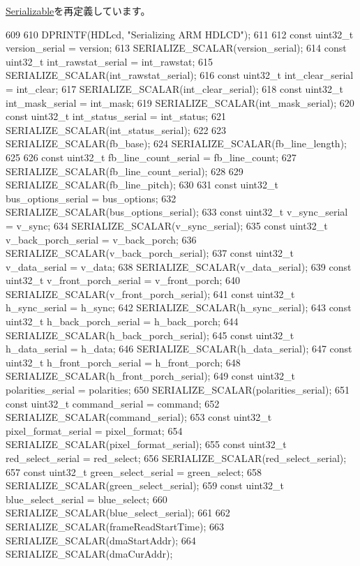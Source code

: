 \hyperlink{classSerializable_ad6272f80ae37e8331e3969b3f072a801}{Serializable}を再定義しています。


\begin{DoxyCode}
609 {
610     DPRINTF(HDLcd, "Serializing ARM HDLCD\n");
611 
612     const uint32_t version_serial = version;
613     SERIALIZE_SCALAR(version_serial);
614     const uint32_t int_rawstat_serial = int_rawstat;
615     SERIALIZE_SCALAR(int_rawstat_serial);
616     const uint32_t int_clear_serial = int_clear;
617     SERIALIZE_SCALAR(int_clear_serial);
618     const uint32_t int_mask_serial = int_mask;
619     SERIALIZE_SCALAR(int_mask_serial);
620     const uint32_t int_status_serial = int_status;
621     SERIALIZE_SCALAR(int_status_serial);
622 
623     SERIALIZE_SCALAR(fb_base);
624     SERIALIZE_SCALAR(fb_line_length);
625 
626     const uint32_t fb_line_count_serial = fb_line_count;
627     SERIALIZE_SCALAR(fb_line_count_serial);
628 
629     SERIALIZE_SCALAR(fb_line_pitch);
630 
631     const uint32_t bus_options_serial = bus_options;
632     SERIALIZE_SCALAR(bus_options_serial);
633     const uint32_t v_sync_serial = v_sync;
634     SERIALIZE_SCALAR(v_sync_serial);
635     const uint32_t v_back_porch_serial = v_back_porch;
636     SERIALIZE_SCALAR(v_back_porch_serial);
637     const uint32_t v_data_serial = v_data;
638     SERIALIZE_SCALAR(v_data_serial);
639     const uint32_t v_front_porch_serial = v_front_porch;
640     SERIALIZE_SCALAR(v_front_porch_serial);
641     const uint32_t h_sync_serial = h_sync;
642     SERIALIZE_SCALAR(h_sync_serial);
643     const uint32_t h_back_porch_serial = h_back_porch;
644     SERIALIZE_SCALAR(h_back_porch_serial);
645     const uint32_t h_data_serial = h_data;
646     SERIALIZE_SCALAR(h_data_serial);
647     const uint32_t h_front_porch_serial = h_front_porch;
648     SERIALIZE_SCALAR(h_front_porch_serial);
649     const uint32_t polarities_serial = polarities;
650     SERIALIZE_SCALAR(polarities_serial);
651     const uint32_t command_serial = command;
652     SERIALIZE_SCALAR(command_serial);
653     const uint32_t pixel_format_serial = pixel_format;
654     SERIALIZE_SCALAR(pixel_format_serial);
655     const uint32_t red_select_serial = red_select;
656     SERIALIZE_SCALAR(red_select_serial);
657     const uint32_t green_select_serial = green_select;
658     SERIALIZE_SCALAR(green_select_serial);
659     const uint32_t blue_select_serial = blue_select;
660     SERIALIZE_SCALAR(blue_select_serial);
661 
662     SERIALIZE_SCALAR(frameReadStartTime);
663     SERIALIZE_SCALAR(dmaStartAddr);
664     SERIALIZE_SCALAR(dmaCurAddr);
}
\end{DoxyCode}
